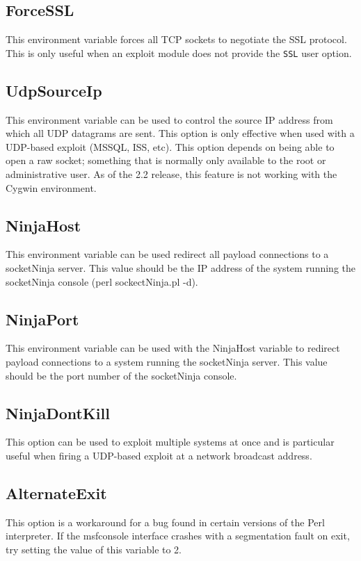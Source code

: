 \documentclass{report}
\begin{document}
	\subsection{ForceSSL}
\par
This environment variable forces all TCP sockets to negotiate the SSL protocol.
This is only useful when an exploit module does not provide the \texttt{SSL}
user option.  

	\subsection{UdpSourceIp}
\par
This environment variable can be used to control the source IP address from
which all UDP datagrams are sent. This option is only effective when used with a
UDP-based exploit (MSSQL, ISS, etc). This option depends on being able to open a
raw socket; something that is normally only available to the root or
administrative user. As of the 2.2 release, this feature is not working with the
Cygwin environment. 

	\subsection{NinjaHost}
\par
This environment variable can be used redirect all payload connections to a
socketNinja server. This value should be the IP address of the system running
the socketNinja console (perl sockectNinja.pl -d).  

	\subsection{NinjaPort}
\par
This environment variable can be used with the NinjaHost variable to redirect
payload connections to a system running the socketNinja server. This value
should be the port number of the socketNinja console. 

	\subsection{NinjaDontKill}
\par
This option can be used to exploit multiple systems at once and is particular
useful when firing a UDP-based exploit at a network broadcast address. 

	\subsection{AlternateExit}
\par
This option is a workaround for a bug found in certain versions of the Perl
interpreter. If the msfconsole interface crashes with a segmentation fault on
exit, try setting the value of this variable to 2. 
	
\end{document}

